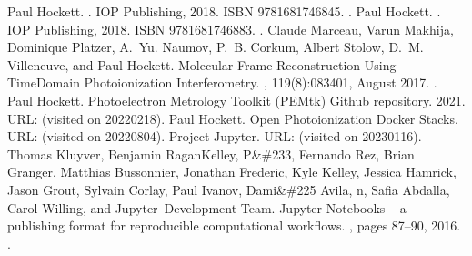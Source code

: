 \documentclass[letterpaper,table,10pt,english]{jupyterBook}
\begin{document}
\begin{sphinxthebibliography}{10}
\sphinxAtStartPar
Paul Hockett. . IOP Publishing, 2018. ISBN 978\sphinxhyphen{}1\sphinxhyphen{}68174\sphinxhyphen{}684\sphinxhyphen{}5. .
\sphinxAtStartPar
Paul Hockett. . IOP Publishing, 2018. ISBN 978\sphinxhyphen{}1\sphinxhyphen{}68174\sphinxhyphen{}688\sphinxhyphen{}3. .
\sphinxAtStartPar
Claude Marceau, Varun Makhija, Dominique Platzer, A. Yu. Naumov, P. B. Corkum, Albert Stolow, D. M. Villeneuve, and Paul Hockett. Molecular Frame Reconstruction Using Time\sphinxhyphen{}Domain Photoionization Interferometry. , 119(8):083401, August 2017. .
\sphinxAtStartPar
Paul Hockett. Photoelectron Metrology Toolkit (PEMtk) Github repository. 2021. URL:  (visited on 2022\sphinxhyphen{}02\sphinxhyphen{}18).
\sphinxAtStartPar
Paul Hockett. Open Photoionization Docker Stacks. URL:  (visited on 2022\sphinxhyphen{}08\sphinxhyphen{}04).
\sphinxAtStartPar
Project Jupyter. URL:  (visited on 2023\sphinxhyphen{}01\sphinxhyphen{}16).
\sphinxAtStartPar
Thomas Kluyver, Benjamin Ragan\sphinxhyphen{}Kelley, P\&\#233, Fernando Rez, Brian Granger, Matthias Bussonnier, Jonathan Frederic, Kyle Kelley, Jessica Hamrick, Jason Grout, Sylvain Corlay, Paul Ivanov, Dami\&\#225 Avila, n, Safia Abdalla, Carol Willing, and Jupyter Development Team. Jupyter Notebooks – a publishing format for reproducible computational workflows. , pages 87–90, 2016. .

\end{sphinxthebibliography}
\end{document}
